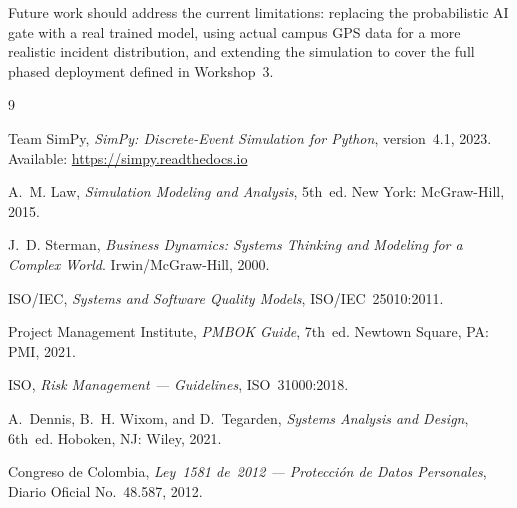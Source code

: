\documentclass[conference,a4paper,10pt]{IEEEtran}
\begin{document}
Future work should address the current limitations: replacing the
probabilistic AI gate with a real trained model, using actual campus
GPS data for a more realistic incident distribution, and extending
the simulation to cover the full phased deployment defined in
Workshop~3.

\begin{thebibliography}{9}

Team SimPy, \textit{SimPy: Discrete-Event Simulation for Python},
version~4.1, 2023. Available: \url{https://simpy.readthedocs.io}

A.~M. Law, \textit{Simulation Modeling and Analysis}, 5th~ed.
New York: McGraw-Hill, 2015.

J.~D. Sterman, \textit{Business Dynamics: Systems Thinking and
Modeling for a Complex World}. Irwin/McGraw-Hill, 2000.

ISO/IEC, \textit{Systems and Software Quality Models},
ISO/IEC~25010:2011.

Project Management Institute, \textit{PMBOK Guide}, 7th~ed.
Newtown Square, PA: PMI, 2021.

ISO, \textit{Risk Management --- Guidelines}, ISO~31000:2018.

A.~Dennis, B.~H. Wixom, and D.~Tegarden,
\textit{Systems Analysis and Design}, 6th~ed. Hoboken, NJ: Wiley, 2021.

Congreso de Colombia, \textit{Ley~1581 de~2012 ---
Protecci\'on de Datos Personales}, Diario Oficial No.~48.587, 2012.

\end{thebibliography}
\end{document}
